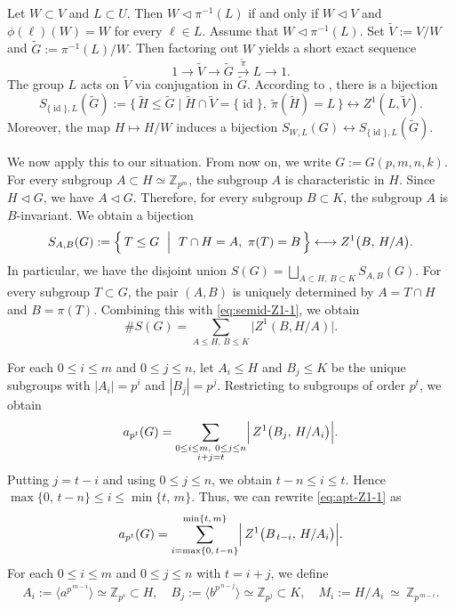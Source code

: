 \documentclass[onecolumn]{article}
\numberwithin{equation}{section}
\theoremstyle{mytheoremstyle}
\DeclareMathOperator{\id}{\mathrm{id}}
\begin{document}
Let $W\subset V$ and $L\subset U$.
Then $W\lhd \pi^{-1}(L)$ if and only if $W\lhd V$ and
$\phi(\ell)(W)=W$ for every $\ell\in L$.
Assume that $W\lhd \pi^{-1}(L)$.
Set $\tilde{V}:=V/W$ and $\tilde{G}:=\pi^{-1}(L)/W$.
Then factoring out $W$ yields a short exact sequence
\[
  1\to \tilde{V}\to \tilde{G}\overset{\tilde{\pi}}{\to}L\to 1.
\]
The group $L$ acts on $\tilde{V}$ via conjugation in $\tilde{G}$.
According to \cite{Robinson1996}, there is a bijection
\[
  S_{\{\id\},L}(\tilde{G})
  :=\{\,\tilde{H}\le \tilde{G}\mid \tilde{H}\cap \tilde{V}=\{\id\},\
      \tilde{\pi}(\tilde{H})=L\,\}
  \longleftrightarrow Z^{1}(L,\tilde{V}).
\]
Moreover, the map $H\mapsto H/W$ induces a bijection
$S_{W,L}(G)\longleftrightarrow S_{\{\id\},L}(\tilde{G})$.


We now apply this to our situation.
From now on, we write $G:=G(p,m,n,k)$.
For every subgroup $A\subset H\simeq \mathbb{Z}_{p^{m}}$, the subgroup $A$ is
characteristic in $H$.
Since $H\lhd G$, we have $A\lhd G$.
Therefore, for every subgroup $B\subset K$, the subgroup $A$ is $B$-invariant.
We obtain a bijection
\begin{equation}\label{eq:semid-Z1-1}
S_{A,B}(G):=\Bigl\{\,T\le G\ \Bigm|\ T\cap H=A,\ \pi(T)=B\,\Bigr\}
\longleftrightarrow Z^{1}\bigl(B,\,H/A\bigr).
\end{equation}
In particular, we have the disjoint union $S(G)=\bigsqcup_{A\subset H,\, B\subset K} S_{A,B}(G)$.
For every subgroup $T\subset G$, the pair $(A,B)$ is uniquely determined by
$A=T\cap H$ and $B=\pi(T)$.
Combining this with \eqref{eq:semid-Z1-1}, we obtain
\[
  \#S(G)=\sum_{A\le H,\, B\le K} \bigl|Z^{1}(B,H/A)\bigr|.
\]

For each $0\le i\le m$ and $0\le j\le n$, let $A_i\le H$ and $B_j\le K$ be the unique subgroups
with $|A_{i}|=p^{i}$ and $|B_{j}|=p^{j}$.
Restricting to subgroups of order $p^{t}$, we obtain
\begin{equation}\label{eq:apt-Z1-1}
a_{p^{t}}(G)=\sum_{\substack{0\le i\le m,\ 0\le j\le n\\ i+j=t}}
\Bigl|\,Z^{1}\bigl(B_{j},\,H/A_{i}\bigr)\Bigr|.
\end{equation}
Putting $j=t-i$ and using $0\le j\le n$, we obtain $t-n\le i\le t$.
Hence $\max\{0,\,t-n\}\le i\le \min\{t,\,m\}$.
Thus, we can rewrite \eqref{eq:apt-Z1-1} as
\begin{equation}\label{eq:apt-Z1-2}
a_{p^{t}}(G)
=
\sum_{i=\max\{0,\,t-n\}}^{\min\{t,\,m\}}
\Bigl|\,Z^{1}\bigl(B_{\,t-i},\,H/A_{i}\bigr)\Bigr|.
\end{equation}
For each $0\le i\le m$ and $0\le j\le n$ with $t=i+j$, we define
\[
A_i:=\langle a^{p^{\,m-i}}\rangle \simeq \mathbb{Z}_{p^{i}} \subset H,\quad
B_j:=\langle b^{p^{\,n-j}}\rangle \simeq \mathbb{Z}_{p^{j}} \subset K,\quad
M_i:=H/A_i\ \simeq\ \mathbb{Z}_{p^{\,m-i}}.
\]
\end{document}
